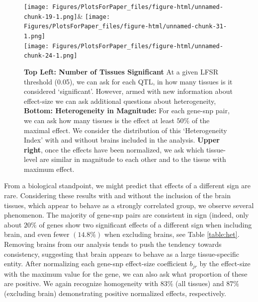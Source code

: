 \newline
\begin{figure}[htbp]
\texttt{[image: Figures/PlotsForPaper\_files/figure-html/unnamed-chunk-19-1.png]}&
\texttt{[image: Figures/PlotsForPaper\_files/figure-html/unnamed-chunk-31-1.png]}\\
\texttt{[image: Figures/PlotsForPaper\_files/figure-html/unnamed-chunk-24-1.png]}\\
\caption{\textbf{Top Left: Number of Tissues Significant} At a given LFSR threshold (0.05), we can ask for each QTL, in how many tissues is it considered `significant'. However, armed with new information about effect-size we can ask additional questions about heterogeneity, \textbf{Bottom: Heterogeneity in Magnitude:} For each gene-snp pair, we can ask how many tissues is the effect at least $50\%$ of the maximal effect. We consider the distribution of this `Heterogeneity Index' with and without brains included in the analysis. \textbf{Upper right}, once the effects have been normalized, we ask which tissue-level are similar in magnitude to each other and to the tissue with maximum effect.}
\label{fig:het}
\end{figure}\newline

From a biological standpoint, we might predict that effects of a different sign are rare. Considering these results with and without the inclusion of the brain tissues, which appear to behave as a strongly correlated group, we observe several phenomenon. The majority of gene-snp pairs are consistent in sign (indeed, only about $20\%$ of genes show two significant effects of a different sign when including brain, and even fewer $(14.8\%)$ when excluding brains, see Table \ref{table:het}. Removing brains from our analysis tends to push the tendency towards consistency, suggesting that brain appears to behave as a large tissue-specific entity. After normalizing each gene-snp effect-size coefficient $b_{jr}$ by the effect-size with the maximum value for the gene, we can also ask what proportion of these are positive. We again recognize homogeneity with $83\%$ (all tissues) and $87\%$  (excluding brain) demonstrating positive normalized effects, respectively. 



